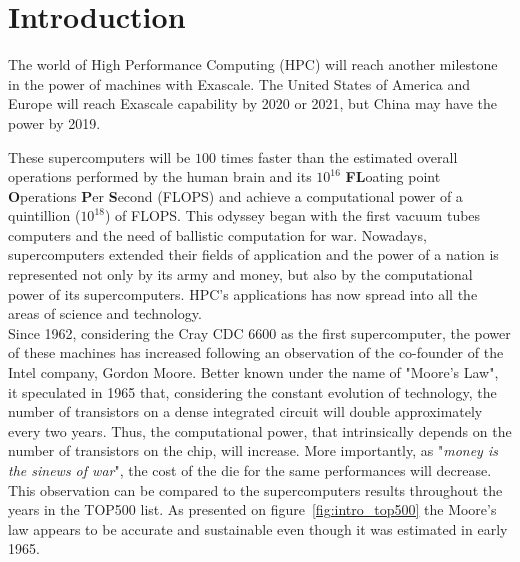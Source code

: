 \chapter*{Introduction}

The world of High Performance Computing (HPC) will reach another milestone in the power of machines with Exascale. 
The United States of America and Europe will reach Exascale capability by 2020 or 2021, but China may have the power by 2019. 

These supercomputers will be $100$ times faster than the estimated overall operations performed by the human brain and its $10^{16}$ \textbf{FL}oating point \textbf{O}perations \textbf{P}er \textbf{S}econd (FLOPS) \cite{kurzweil2010singularity} and achieve a computational power of a quintillion ($10^{18}$) of FLOPS.
This odyssey began with the first vacuum tubes computers and the need of ballistic computation for war. 
Nowadays, supercomputers extended their fields of application and the power of a nation is represented not only by its army and money, but also by the computational power of its supercomputers.
HPC's applications has now spread into all the areas of science and technology.\\

Since 1962, considering the Cray CDC 6600 as the first supercomputer, the power of these machines has increased following an observation of the co-founder of the Intel company, Gordon Moore. 
Better known under the name of "Moore's Law", it speculated in 1965 that, considering the constant evolution of technology, the number of transistors on a dense integrated circuit will double approximately every two years. 
Thus, the computational power, that intrinsically depends on the number of transistors on the chip, will increase.
More importantly, as "\textit{money is the sinews of war}", the cost of the die for the same performances will decrease.  
This observation can be compared to the supercomputers results throughout the years in the TOP500 list. 
As presented on figure~\ref{fig:intro_top500} the Moore's law appears to be accurate and sustainable even though it was estimated in early 1965. 

